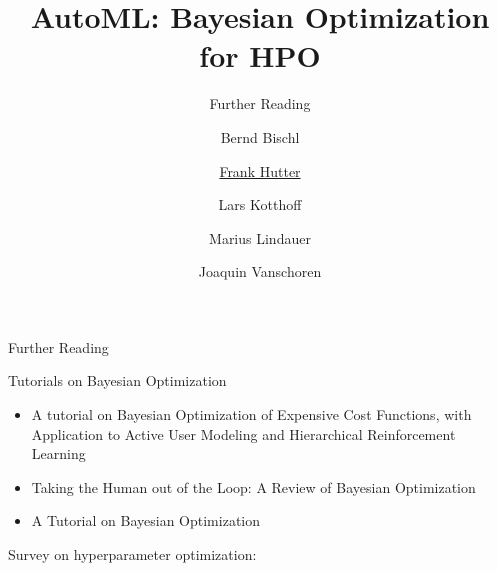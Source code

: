 


\title{AutoML: Bayesian Optimization for HPO}
\subtitle{Further Reading}
\author[Marius Lindauer]{Bernd Bischl \and \underline{Frank Hutter} \and Lars Kotthoff\newline \and Marius Lindauer \and Joaquin Vanschoren}
\institute{}
\date{}
    
    
    

\maketitle

\begin{frame}[c]{Further Reading}

Tutorials on Bayesian Optimization
\begin{itemize}
    \item A tutorial on Bayesian Optimization of Expensive Cost Functions, with Application to Active User Modeling and Hierarchical Reinforcement Learning 
    \item Taking the Human out of the Loop: A Review of Bayesian Optimization 
    \item A Tutorial on Bayesian Optimization 
\end{itemize}

\bigskip

Survey on hyperparameter optimization:     

\end{frame}
